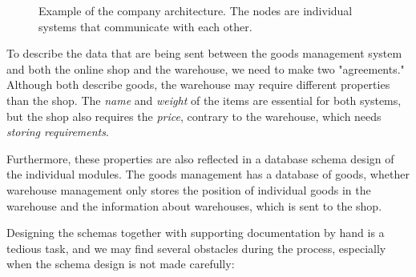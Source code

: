 \begin{figure}[h]\centering
  \caption{Example of the company architecture. The nodes are individual systems that communicate with each other.}
  \label{fig:company-schema}
\end{figure}

To describe the data that are being sent between the goods management system and both the online shop and the warehouse, we need to make two "agreements." Although both describe goods, the warehouse may require different properties than the shop. The \textit{name} and \textit{weight} of the items are essential for both systems, but the shop also requires the \textit{price}, contrary to the warehouse, which needs \textit{storing requirements}.

Furthermore, these properties are also reflected in a database schema design of the individual modules. The goods management has a database of goods, whether warehouse management only stores the position of individual goods in the warehouse and the information about warehouses, which is sent to the shop.

\medskip

Designing the schemas together with supporting documentation by hand is a tedious task, and we may find several obstacles during the process, especially when the schema design is not made carefully:

